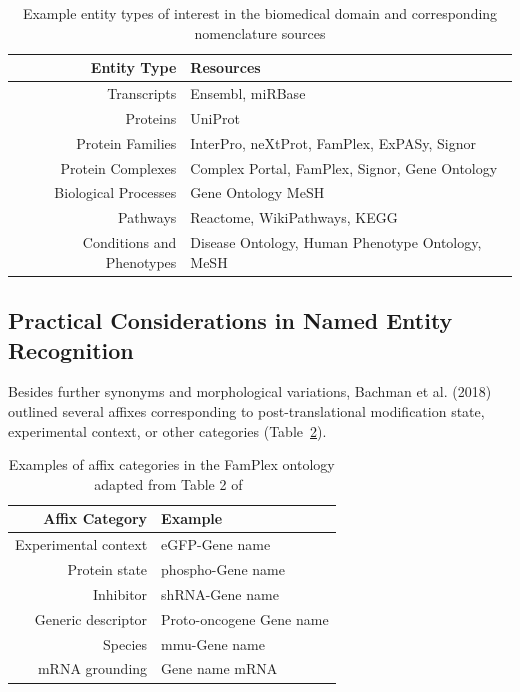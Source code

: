 \begin{table}
    \centering
    \begin{tabular}{ r l }
        Entity Type & Resources \\
        \hline
        Transcripts & Ensembl, miRBase \\
        Proteins & UniProt \\
        Protein Families & InterPro, neXtProt, FamPlex, ExPASy, Signor \\
        Protein Complexes & Complex Portal, FamPlex, Signor, Gene Ontology \\
        Biological Processes & Gene Ontology MeSH \\
        Pathways & Reactome, WikiPathways, KEGG \\
        Conditions and Phenotypes & Disease Ontology, Human Phenotype Ontology, MeSH
    \end{tabular}
    \caption{Example entity types of interest in the biomedical domain and corresponding nomenclature sources}
    \label{table:other_nomenclature_databases}
\end{table}

\subsection{Practical Considerations in Named Entity Recognition}

Besides further synonyms and morphological variations, Bachman et al. (2018)~\cite{Bachman2018} outlined several affixes corresponding to post-translational modification state, experimental context, or other categories (Table~\ref{table:affix_categories}).

\begin{table}
    \centering
    \begin{tabular}{ r l }
        Affix Category & Example \\
        \hline
        Experimental context & eGFP-{Gene name} \\
        Protein state & phospho-{Gene name} \\
        Inhibitor & shRNA-{Gene name} \\
        Generic descriptor & Proto-oncogene {Gene name} \\
        Species & mmu-{Gene name} \\
        mRNA grounding & {Gene name} mRNA
    \end{tabular}
    \caption{Examples of affix categories in the FamPlex ontology adapted from Table 2 of~\cite{Bachman2018}}
    \label{table:affix_categories}
\end{table}

